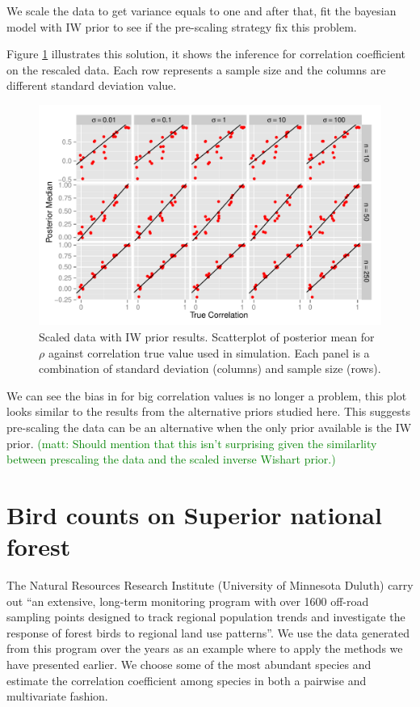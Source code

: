 \documentclass[a4paper]{article}
\newcommand{\matt}[1]{\textcolor{green}{(matt: #1)}}
\begin{document}
We scale the data to get variance equals to one and after that, fit the bayesian model with IW prior to see if the pre-scaling strategy fix this problem. 

Figure \ref{sciw} illustrates this solution, it shows the inference for correlation coefficient on the rescaled data. Each row represents a sample size and the columns are different standard deviation value. 

\begin{figure}[htbp]
   \centering
   \includegraphics[width=\textwidth]{scIW} %
    \vspace{-.5in}
   \caption{Scaled data with IW prior results. Scatterplot of posterior mean for $\rho$  against correlation true value used in simulation. Each panel is a combination of standard deviation (columns) and sample size (rows). \label{sciw} }
\end{figure}

We can see the bias in for big correlation values is no longer a problem, this plot looks similar to the results from the alternative priors studied here. This suggests pre-scaling the data can be an alternative when the only prior available is the IW prior. \matt{Should mention that this isn't surprising given the similarlity between prescaling the data and the scaled inverse Wishart prior.}


\section{Bird counts on Superior national forest}

The Natural Resources Research Institute (University of Minnesota Duluth) carry out ``an extensive, long-term monitoring program with over 1600 off-road sampling points designed to track regional population trends and investigate the response of forest birds to regional land use patterns''. We use the data generated from this program over the years as an example where to apply the methods we have presented earlier. We choose some of the most abundant species and estimate the correlation coefficient among species in both a pairwise and multivariate fashion. 
\end{document}
